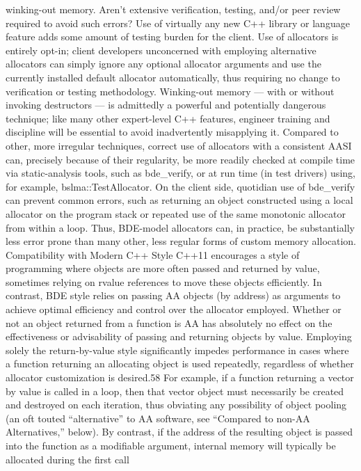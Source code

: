 winking-out memory. Aren’t extensive verification, testing, and/or peer review
required to avoid such errors?
Use of virtually any new C++ library or language feature adds some amount of
testing burden for the client. Use of allocators is entirely opt-in; client developers
unconcerned with employing alternative allocators can simply ignore any optional
allocator arguments and use the currently installed default allocator automatically,
thus requiring no change to verification or testing methodology. Winking-out
memory — with or without invoking destructors — is admittedly a powerful and
potentially dangerous technique; like many other expert-level C++ features, engineer
training and discipline will be essential to avoid inadvertently misapplying it.
Compared to other, more irregular techniques, correct use of allocators with a
consistent AASI can, precisely because of their regularity, be more readily checked
at compile time via static-analysis tools, such as bde_verify, or at run time (in test
drivers) using, for example, bslma::TestAllocator. On the client side, quotidian
use of bde_verify can prevent common errors, such as returning an object
constructed using a local allocator on the program stack or repeated use of the same
monotonic allocator from within a loop. Thus, BDE-model allocators can, in
practice, be substantially less error prone than many other, less regular forms of
custom memory allocation.
Compatibility with Modern C++ Style
C++11 encourages a style of programming where objects are more often passed and
returned by value, sometimes relying on rvalue references to move these objects
efficiently. In contrast, BDE style relies on passing AA objects (by address) as
arguments to achieve optimal efficiency and control over the allocator employed.
Whether or not an object returned from a function is AA has absolutely no effect on
the effectiveness or advisability of passing and returning objects by value.
Employing solely the return-by-value style significantly impedes performance in
cases where a function returning an allocating object is used repeatedly, regardless
of whether allocator customization is desired.58 For example, if a function returning
a vector by value is called in a loop, then that vector object must necessarily be
created and destroyed on each iteration, thus obviating any possibility of object
pooling (an oft touted “alternative” to AA software, see “Compared to non-AA
Alternatives,” below).
By contrast, if the address of the resulting object is passed into the function as a
modifiable argument, internal memory will typically be allocated during the first call

